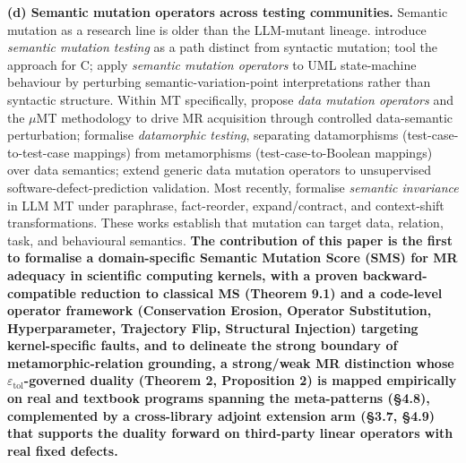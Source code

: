 \documentclass[acmsmall,screen,review]{acmart}
\begin{document}
\textbf{(d) Semantic mutation operators across testing communities.}
Semantic mutation as a research line is older than the LLM-mutant
lineage. \citet{7a6c280d9584691800e71876c716ea229335abeb} introduce \emph{semantic
mutation testing} as a path distinct from syntactic mutation; \citet{dan2012smtc}
tool the approach for C; \citet{derezinska2019uml}
apply \emph{semantic mutation operators} to UML state-machine behaviour
by perturbing semantic-variation-point interpretations rather than
syntactic structure. Within MT specifically, \citet{sun2016mumt,sun2024datamutation}
propose \emph{data mutation operators} and the $\mu$MT methodology to drive
MR acquisition through controlled data-semantic perturbation; \citet{zhu2020datamorphic}
formalise \emph{datamorphic testing}, separating
datamorphisms (test-case-to-test-case mappings) from metamorphisms
(test-case-to-Boolean mappings) over data semantics; \citet{chan2024metamorphic}
extend generic data mutation operators to unsupervised
software-defect-prediction validation. Most recently, \citet{0fa97cc4e2a0ffb6a777669b1b541c0372fac0d2}
formalise \emph{semantic invariance} in LLM MT under paraphrase,
fact-reorder, expand/contract, and context-shift transformations. These
works establish that mutation can target data, relation, task, and
behavioural semantics. \textbf{The contribution of this paper is the
first to formalise a domain-specific Semantic Mutation Score (SMS) for
MR adequacy in scientific computing kernels, with a proven
backward-compatible reduction to classical MS (Theorem 9.1) and a
code-level operator framework (Conservation Erosion, Operator
Substitution, Hyperparameter, Trajectory Flip, Structural Injection)
targeting kernel-specific faults, and to delineate the strong boundary
of metamorphic-relation grounding, a strong/weak MR distinction whose
$\varepsilon_{\mathrm{tol}}$-governed duality (Theorem 2, Proposition 2)
is mapped empirically on real and textbook programs spanning the
meta-patterns (§4.8), complemented by a cross-library adjoint extension
arm (§3.7, §4.9) that supports the duality forward on third-party
linear operators with real fixed defects.}
\end{document}
